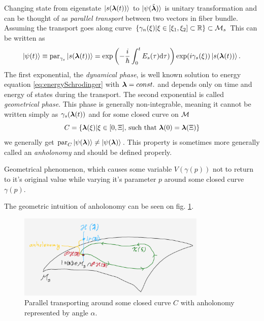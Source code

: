 Changing state from eigenstate $\ket{s({\bm\lambda}(t))}$ to $\ket{\psi(\tilde{{\bm\lambda}})}$ is unitary transformation and can be thought of as \emph{parallel transport} between two vectors in fiber bundle. Assuming the transport goes along curve $\{\gamma_n(\xi)|\xi\in[\xi_1,\xi_2]\subset \mathbb{R}\}\subset \mathcal{M}_s$ This can be written as
\begin{equation}
    \ket{\psi(t)} \equiv \textrm{par}_{\gamma_s}\ket{s({\bm\lambda}(t))} = \exp\left(-\frac{i}{\hbar}\int_0^tE_s(\tau)\mathrm{d}\tau)\right)\exp(i\gamma_s(\xi))\ket{s({\bm\lambda}(t))}.
    \label{eq:phasesOnManifold}
\end{equation}
The first exponential, the \emph{dynamical phase}, is well known solution to energy \Schrodinger equation \ref{eq:energySchrodinger} with ${\bm\lambda}=const.$ and depends only on time and energy of states during the transport. The second exponential is called \emph{geometrical phase}. This phase is generally non-integrable, meaning it cannot be written simply as $\gamma_s({\bm\lambda}(t))$ and for some closed curve on $\mathcal{M}$
\begin{equation}
    C=\{{\bm\lambda}(\xi)|\xi\in[0,\Xi] \text{, such that }{\bm\lambda}(0)={\bm\lambda}(\Xi)\}
\end{equation} 
we generally get $\textrm{par}_C \ket{\psi({\bm\lambda})}\neq \ket{\psi({\bm\lambda})}$. This property is sometimes more generally called an \emph{anholonomy} and should be defined properly.
\begin{definition}[Anholonomy]
    Geometrical phenomenon, which causes some variable $V(\gamma(p))$ not to return to it's original value while varying it's parameter $p$ around some closed curve $\gamma(p)$. 
\end{definition}
The geometric intuition of anholonomy can be seen on fig. \ref{fig:parallelTransportClosed}.
\begin{figure}[h]
    \centering
    \includegraphics[width=0.8\textwidth]{../img/parallelTransportClosedCurve.png}
\caption{Parallel transporting around some closed curve $C$ with anholonomy represented by angle $\alpha$.}
    \label{fig:parallelTransportClosed}
\end{figure}

